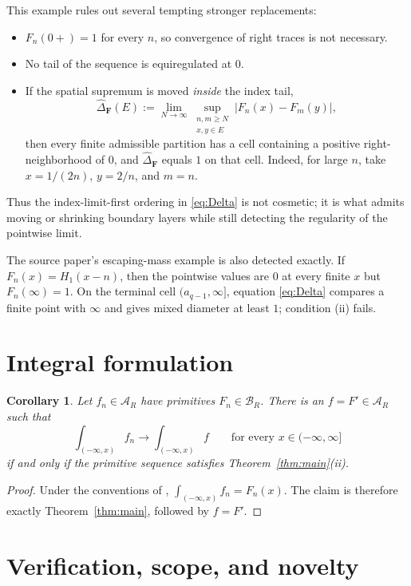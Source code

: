 \documentclass[11pt]{article}
\newtheorem{corollary}[theorem]{Corollary}
\newcommand{\BR}{\mathcal B_R}
\newcommand{\AR}{\mathcal A_R}
\begin{document}
This example rules out several tempting stronger replacements:
\begin{itemize}
\item \(F_n(0+)=1\) for every \(n\), so convergence of right traces is not
      necessary.
\item No tail of the sequence is equiregulated at \(0\).
\item If the spatial supremum is moved \emph{inside} the index tail,
      \[
       \widehat\Delta_{\mathbf F}(E)
       :=\lim_{N\to\infty}
       \sup_{\substack{n,m\geq N\\x,y\in E}}
          |F_n(x)-F_m(y)|,
      \]
      then every finite admissible partition has a cell containing a
      positive right-neighborhood of \(0\), and
      \(\widehat\Delta_{\mathbf F}\) equals \(1\) on that cell.  Indeed, for
      large \(n\), take \(x=1/(2n)\), \(y=2/n\), and \(m=n\).
\end{itemize}
Thus the index-limit-first ordering in \eqref{eq:Delta} is not cosmetic; it
is what admits moving or shrinking boundary layers while still detecting
the regularity of the pointwise limit.

The source paper's escaping-mass example is also detected exactly.  If
\(F_n(x)=H_1(x-n)\), then the pointwise values are \(0\) at every finite
\(x\) but \(F_n(\infty)=1\).  On the terminal cell
\((a_{q-1},\infty]\), equation \eqref{eq:Delta} compares a finite point with
\(\infty\) and gives mixed diameter at least \(1\); condition (ii) fails.

\section{Integral formulation}

\begin{corollary}\label{cor:integral}
Let \(f_n\in\AR\) have primitives \(F_n\in\BR\).  There is an
\(f=F'\in\AR\) such that
\[
 \int_{(-\infty,x)}f_n\longrightarrow
 \int_{(-\infty,x)}f
 \qquad\text{for every }x\in(-\infty,\infty]
\]
if and only if the primitive sequence satisfies
Theorem~\ref{thm:main}(ii).
\end{corollary}

\begin{proof}
Under the conventions of \cite{Talvila},
\(\int_{(-\infty,x)}f_n=F_n(x)\).  The claim is therefore exactly
Theorem~\ref{thm:main}, followed by \(f=F'\).
\end{proof}

\section{Verification, scope, and novelty}
\end{document}
